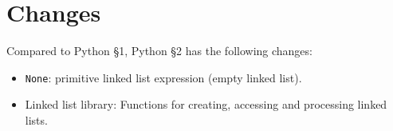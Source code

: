 





\section{Changes}

Compared to Python \S 1, Python \S 2 has the following changes:
\begin{itemize}
  \item \lstinline{None}: primitive linked list expression (empty linked list).
  \item Linked list library: Functions for creating, accessing and
    processing linked lists.
\end{itemize}



\newpage



% 








\newpage



\newpage







\newpage




